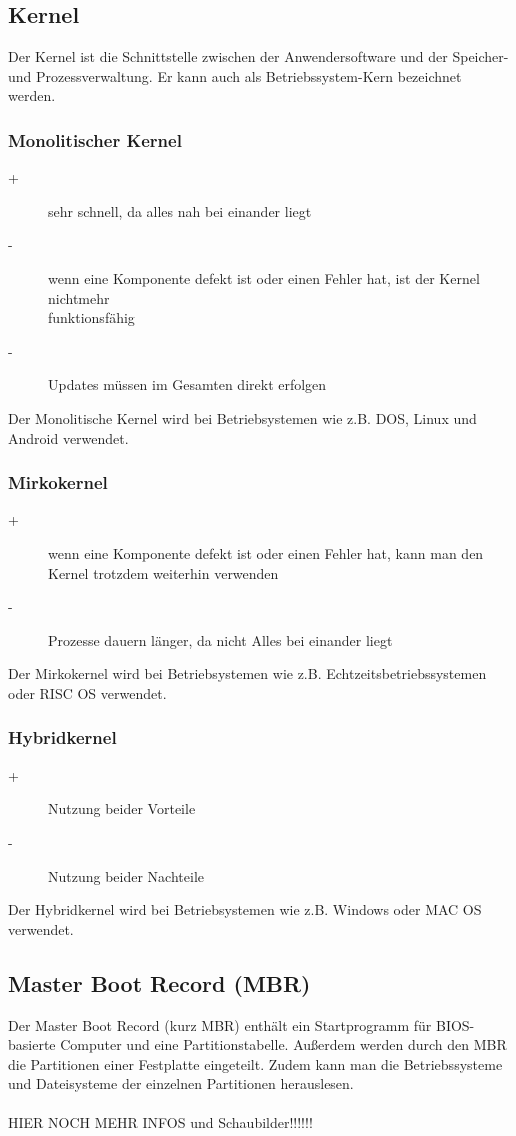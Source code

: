 \documentclass[12pt,a4paper]{article}
\begin{document}
\subsection{Kernel}
Der Kernel ist die Schnittstelle zwischen der Anwendersoftware und der Speicher- und Prozessverwaltung. Er kann auch als Betriebssystem-Kern bezeichnet werden.
\subsubsection{Monolitischer Kernel}
\begin{description}
    \item[+]{sehr schnell, da alles nah bei einander liegt}
    \item[-]{wenn eine Komponente defekt ist oder einen Fehler hat, ist der Kernel nichtmehr \\ funktionsfähig}
    \item[-]{Updates müssen im Gesamten direkt erfolgen}
\end{description}
Der Monolitische Kernel wird bei Betriebsystemen wie z.B. DOS, Linux und Android verwendet.
\subsubsection{Mirkokernel}
\begin{description}
    \item[+]{wenn eine Komponente defekt ist oder einen Fehler hat, kann man den Kernel trotzdem weiterhin verwenden}
    \item[-]{Prozesse dauern länger, da nicht Alles bei einander liegt}
\end{description}
Der Mirkokernel wird bei Betriebsystemen wie z.B. Echtzeitsbetriebssystemen oder RISC OS verwendet.
\subsubsection{Hybridkernel}
\begin{description}
    \item[+]{Nutzung beider Vorteile}
    \item[-]{Nutzung beider Nachteile}
\end{description}
Der Hybridkernel wird bei Betriebsystemen wie z.B. Windows oder MAC OS verwendet.
\subsection{Master Boot Record (MBR)}
Der Master Boot Record (kurz MBR) enthält ein Startprogramm für BIOS-basierte Computer und eine Partitionstabelle.
Außerdem werden durch den MBR die Partitionen einer Festplatte eingeteilt. Zudem kann man die Betriebssysteme und Dateisysteme der einzelnen Partitionen herauslesen.
\\
\\HIER NOCH MEHR INFOS und Schaubilder!!!!!!
\\
\end{document}
